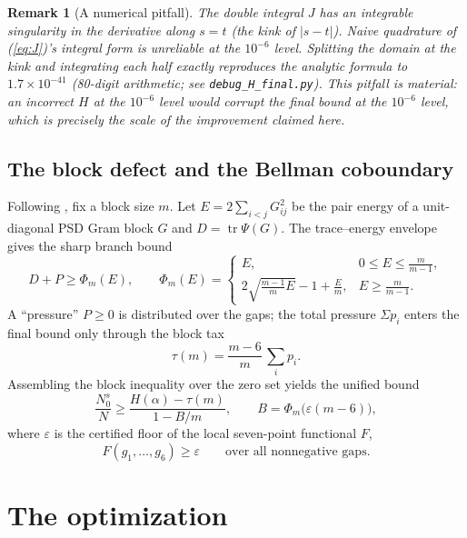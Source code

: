 \documentclass[11pt]{article}
\newtheorem{remark}[theorem]{Remark}
\newcommand{\tr}{\operatorname{tr}}
\newcommand{\eps}{\varepsilon}
\newcommand{\Nc}{N_0^s}
\newcommand{\N}{N}
\begin{document}
\begin{remark}[A numerical pitfall]
\label{rem:kink}
The double integral $J$ has an integrable singularity in the derivative along
$s=t$ (the kink of $|s-t|$).  Naive quadrature of (\ref{eq:J})'s integral
form is unreliable at the $10^{-6}$ level.  Splitting the domain at the kink
and integrating each half exactly reproduces the analytic formula to
$1.7\times10^{-41}$ (80-digit arithmetic; see \texttt{debug\_H\_final.py}).
This pitfall is material: an incorrect $H$ at the $10^{-6}$ level would
corrupt the final bound at the $10^{-6}$ level, which is precisely the scale
of the improvement claimed here.
\end{remark}

\subsection{The block defect and the Bellman coboundary}
\label{sec:block}

Following \cite{tawanerguo}, fix a block size $m$.  Let
$E=2\sum_{i<j}G_{ij}^2$ be the pair energy of a unit-diagonal PSD Gram block
$G$ and $D=\tr\Psi(G)$.  The trace--energy envelope \cite{tawanerguo} gives
the sharp branch bound
\begin{equation}
 D+P \ge \Phi_m(E),\qquad
 \Phi_m(E)=\begin{cases}
 E, & 0\le E\le \frac{m}{m-1},\\[2pt]
 2\sqrt{\frac{m-1}{m}E}-1+\frac Em, & E\ge \frac{m}{m-1}.
 \end{cases}
 \label{eq:envelope}
\end{equation}
A ``pressure'' $P\ge0$ is distributed over the gaps; the total pressure
$\Sigma p_i$ enters the final bound only through the block tax
\[
 \tau(m) = \frac{m-6}{m}\,\sum_i p_i .
\]
Assembling the block inequality over the zero set yields the unified bound
\begin{equation}
 \frac{\Nc}{\N} \ge \frac{H(\alpha) - \tau(m)}{1 - B/m},
 \qquad B=\Phi_m\bigl(\eps(m-6)\bigr),
 \label{eq:unified}
\end{equation}
where $\eps$ is the certified floor of the local seven-point functional $F$,
\begin{equation}
 F(g_1,\ldots,g_6) \ge \eps \qquad\text{over all nonnegative gaps}.
 \label{eq:floor}
\end{equation}

\section{The optimization}
\label{sec:opt}
\end{document}
